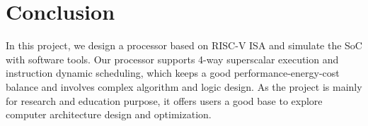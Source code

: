 
\let\clearpage\relax
\chapter{Conclusion}

In this project, we design a processor based on RISC-V ISA and simulate the SoC with software tools. Our processor supports 4-way superscalar execution and instruction dynamic scheduling, which keeps a good performance-energy-cost balance and involves complex algorithm and logic design. As the project is mainly for research and education purpose, it offers users a good base to explore computer architecture design and optimization.
